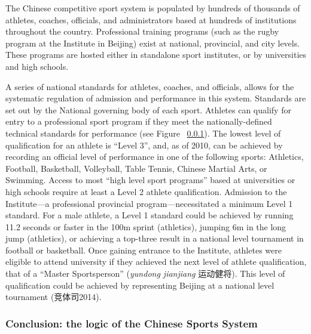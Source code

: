 \begin{CJK}{UTF8}{gbsn}

The Chinese competitive sport system is populated by hundreds of thousands of athletes, coaches, officials, and administrators based at hundreds of institutions throughout the country.  Professional training programs (such as the rugby program at the Institute in Beijing) exist at national, provincial, and city levels.  These programs are hosted either in standalone sport institutes, or by universities and high schools.

A series of national standards for athletes, coaches, and officials, allows for the systematic regulation of admission and performance in this system.  Standards are set out by the National governing body of each sport.  Athletes can qualify for entry to a professional sport program if they meet the nationally-defined technical standards for performance (see Figure ~\ref{}).  The lowest level of qualification for an athlete is ``Level 3'', and, as of 2010, can be achieved by recording an official level of performance in one of the following sports: Athletics, Football, Basketball, Volleyball, Table Tennis, Chinese Martial Arts, or Swimming.  Access to most ``high level sport programs'' based at universities or high schools require at least a Level 2 athlete qualification.  Admission to the Institute---a professional provincial program---necessitated a minimum Level 1 standard.  For a male athlete, a Level 1 standard could be achieved by running 11.2 seconds or faster in the 100m sprint (athletics), jumping 6m in the long jump (athletics), or achieving a top-three result in a national level tournament in football or basketball.  Once gaining entrance to the Institute, athletes were eligible to attend university if they achieved the next level of athlete qualification, that of a ``Master Sportsperson'' (\textit{yundong jianjiang} 运动健将).  This level of qualification could be achieved by representing Beijing at a national level tournament (竞体司2014).






\subsubsection{Conclusion: the logic of the Chinese Sports System}


\end{CJK}

